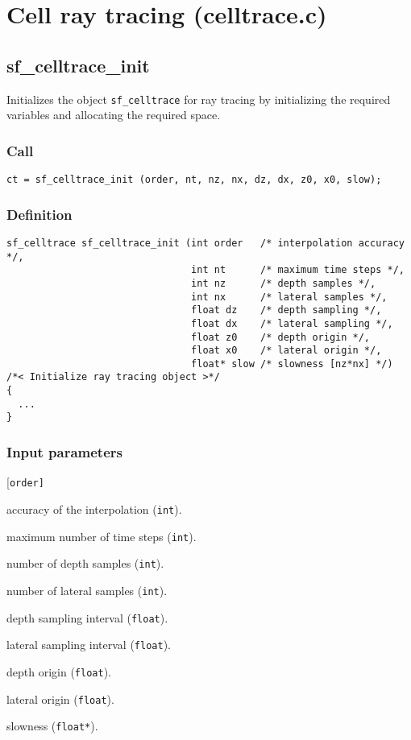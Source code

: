 \section{Cell ray tracing (celltrace.c)}




\subsection{{sf\_celltrace\_init}}
Initializes the object \texttt{sf\_celltrace} for ray tracing by initializing the required variables and allocating the required space.

\subsubsection*{Call}
\begin{verbatim}ct = sf_celltrace_init (order, nt, nz, nx, dz, dx, z0, x0, slow);\end{verbatim}

\subsubsection*{Definition}
\begin{verbatim}
sf_celltrace sf_celltrace_init (int order   /* interpolation accuracy */, 
                                int nt      /* maximum time steps */,
                                int nz      /* depth samples */, 
                                int nx      /* lateral samples */, 
                                float dz    /* depth sampling */, 
                                float dx    /* lateral sampling */, 
                                float z0    /* depth origin */, 
                                float x0    /* lateral origin */, 
                                float* slow /* slowness [nz*nx] */)
/*< Initialize ray tracing object >*/
{
  ...
} 
\end{verbatim}

\subsubsection*{Input parameters}
\begin{desclist}{\tt }{\quad}[\tt order]
   \setlength\itemsep{0pt}
   \item[order] accuracy of the interpolation (\texttt{int}). 
   \item[nt]    maximum number of time steps (\texttt{int}). 
   \item[nz]    number of depth samples (\texttt{int}). 
   \item[nx]    number of lateral samples (\texttt{int}). 
   \item[dz]    depth sampling interval (\texttt{float}). 
   \item[dx]    lateral sampling interval (\texttt{float}). 
   \item[z0]    depth origin (\texttt{float}). 
   \item[x0]    lateral origin (\texttt{float}). 
   \item[slow]  slowness (\texttt{float*}).  
\end{desclist}

